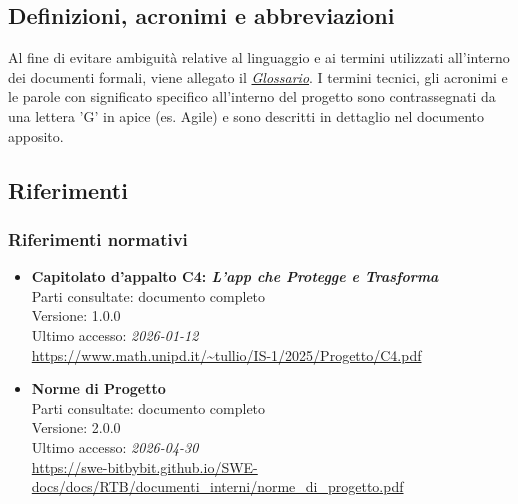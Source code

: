 \documentclass[a4paper,12pt]{article}
\begin{document}

\subsection{Definizioni, acronimi e abbreviazioni} \label{sec:definizioni_acronimi_abbreviazioni}

Al fine di evitare ambiguità relative al linguaggio e ai termini utilizzati all'interno dei documenti formali, viene allegato il \href{https://swe-bitbybit.github.io/SWE-docs/docs/RTB/documenti_interni/Glossario.pdf}{\textit{Glossario}}.
I termini tecnici, gli acronimi e le parole con significato specifico all'interno del progetto sono contrassegnati da una lettera 'G' in apice (es. Agile) e sono descritti in dettaglio nel documento apposito.


\subsection{Riferimenti} \label{sec:riferimenti}

\subsubsection{Riferimenti normativi}\label{sec:riferimenti_normativi}
\begin{itemize}
    \item \textbf{Capitolato d'appalto C4: \emph{L'app che Protegge e Trasforma}}\\
        Parti consultate: documento completo\\
        Versione: 1.0.0\\
        Ultimo accesso: \textit{2026-01-12}\\
        \url{https://www.math.unipd.it/~tullio/IS-1/2025/Progetto/C4.pdf}

    \item \textbf{Norme di Progetto}\\
        Parti consultate: documento completo\\
        Versione: 2.0.0\\
        Ultimo accesso: \textit{2026-04-30}\\
        \url{https://swe-bitbybit.github.io/SWE-docs/docs/RTB/documenti_interni/norme_di_progetto.pdf}
\end{itemize}
\end{document}
